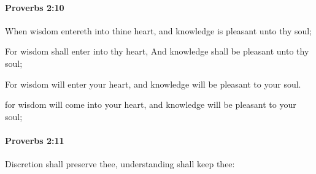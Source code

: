 		\paragraph{Proverbs 2:10} %
			\label{PROVERBS-2-10}

			When wisdom entereth into thine heart, and knowledge is pleasant unto thy soul;

			\begin{versebox}
					\item[BHS] 
					\item[ASV] For wisdom shall enter into thy heart, And knowledge shall be pleasant unto thy soul;
					\item[NIV] For wisdom will enter your heart, and knowledge will be pleasant to your soul.
					\item[NRSV] for wisdom will come into your heart, and knowledge will be pleasant to your soul;
			\end{versebox}

		\paragraph{Proverbs 2:11} %
			\label{PROVERBS-2-11}

			Discretion shall preserve thee, understanding shall keep thee:

